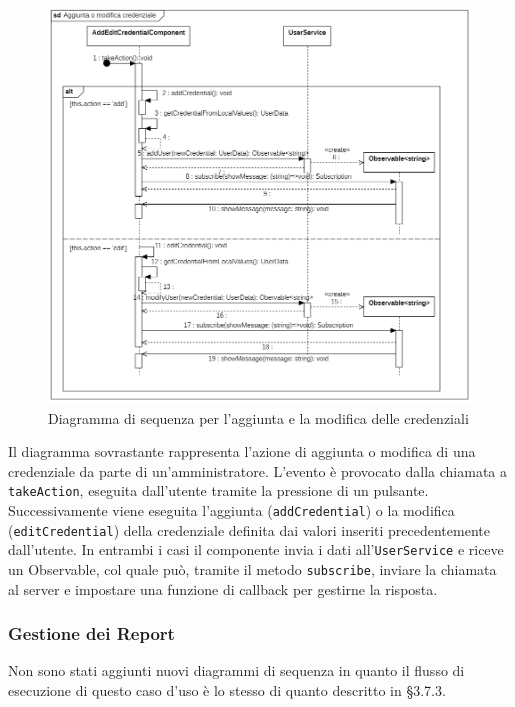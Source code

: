 \begin{figure}[H]
	\centering
	\includegraphics[width=18cm]{res/images/webapp-credenzialiAddEdit-diagrammaSequenza.png}
	\caption{Diagramma di sequenza per l'aggiunta e la modifica delle credenziali}
	\label{fig:DiagrammaSequenzaVisualizzazioneCredenziali}
\end{figure}
Il diagramma sovrastante rappresenta l'azione di aggiunta o modifica di una credenziale da parte di un'amministratore. L'evento è provocato dalla chiamata a \texttt{takeAction}, eseguita dall'utente tramite la pressione di un pulsante. Successivamente viene eseguita l'aggiunta (\texttt{addCredential}) o la modifica (\texttt{editCredential}) della credenziale definita dai valori inseriti precedentemente dall'utente. In entrambi i casi il componente invia i dati all'\texttt{UserService} e riceve un Observable, col quale può, tramite il metodo \texttt{subscribe}, inviare la chiamata al server e impostare una funzione di callback per gestirne la risposta.

\subsubsection{Gestione dei Report}

Non sono stati aggiunti nuovi diagrammi di sequenza in quanto il flusso di esecuzione di questo caso d'uso è lo stesso di quanto descritto in §3.7.3.


